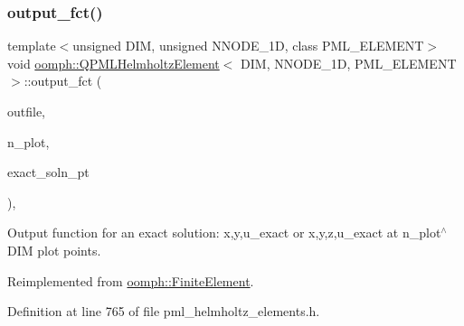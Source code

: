 \subsubsection{\texorpdfstring{output\+\_\+fct()}{output\_fct()}\hspace{0.1cm}{\footnotesize\ttfamily [1/2]}}
{\footnotesize\ttfamily template$<$unsigned D\+IM, unsigned N\+N\+O\+D\+E\+\_\+1D, class P\+M\+L\+\_\+\+E\+L\+E\+M\+E\+NT$>$ \\
void \hyperlink{classoomph_1_1QPMLHelmholtzElement}{oomph\+::\+Q\+P\+M\+L\+Helmholtz\+Element}$<$ D\+IM, N\+N\+O\+D\+E\+\_\+1D, P\+M\+L\+\_\+\+E\+L\+E\+M\+E\+NT $>$\+::output\+\_\+fct (\begin{DoxyParamCaption}\item[{std\+::ostream \&}]{outfile,  }\item[{const unsigned \&}]{n\+\_\+plot,  }\item[{\hyperlink{classoomph_1_1FiniteElement_a690fd33af26cc3e84f39bba6d5a85202}{Finite\+Element\+::\+Steady\+Exact\+Solution\+Fct\+Pt}}]{exact\+\_\+soln\+\_\+pt }\end{DoxyParamCaption})\hspace{0.3cm}{\ttfamily [inline]}, {\ttfamily [virtual]}}



Output function for an exact solution\+: x,y,u\+\_\+exact or x,y,z,u\+\_\+exact at n\+\_\+plot$^\wedge$\+D\+IM plot points. 



Reimplemented from \hyperlink{classoomph_1_1FiniteElement_a22b695c714f60ee6cd145be348042035}{oomph\+::\+Finite\+Element}.



Definition at line 765 of file pml\+\_\+helmholtz\+\_\+elements.\+h.

\mbox{\label{classoomph_1_1QPMLHelmholtzElement_a3df73a2a3a9ad64f555719ecee3f7f40}} 
